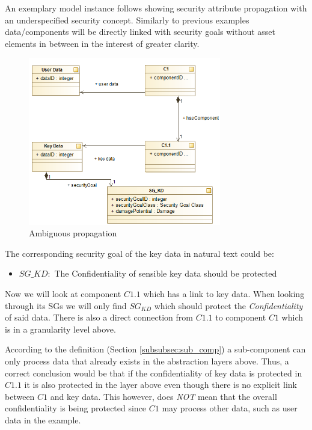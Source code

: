 An exemplary model instance follows showing security attribute propagation with an underspecified security concept. Similarly to previous examples data/components will be directly linked with security goals without asset elements in between in the interest of greater clarity.

\begin{figure}[H]
\centering
\includegraphics[width=0.75\textwidth]{pictures/sg_deduction.png}
\caption{Ambiguous propagation}
\label{fig:subcomponent_dilemma}
\end{figure} 

The corresponding security goal of the key data in natural text could be:

\begin{itemize}
\item[]\textbf{$SG\_{KD}:$} The Confidentiality of sensible key data should be protected
\end{itemize}

Now we will look at component $C1.1$ which has a link to key data. When looking through its SGs we will only find $SG_{KD}$ which should protect the \textit{Confidentiality} of said data. There is also a direct connection from $C1.1$ to component $C1$ which is in a granularity level above. 

According to the definition (Section \ref{subsubsec:sub_comp}) a sub-component can only process data that already exists in the abstraction layers above. Thus, a correct conclusion would be that if the confidentiality of key data is protected in $C1.1$ it is also protected in the layer above even though there is no explicit link between $C1$ and key data. This however, does \textit{NOT} mean that the overall confidentiality is being protected since $C1$ may process other data, such 
as user data in the example.


